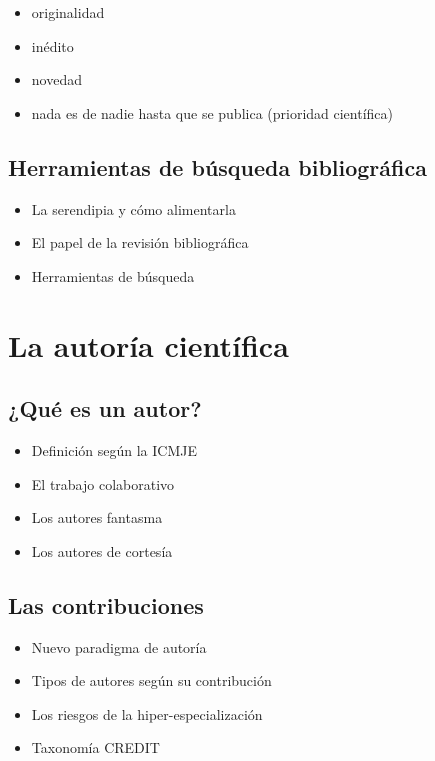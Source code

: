 \documentclass[
]{book}
\providecommand{\tightlist}{%
  \setlength{\itemsep}{0pt}\setlength{\parskip}{0pt}}
\begin{document}
\begin{itemize}
\tightlist
\item
  originalidad
\item
  inédito
\item
  novedad
\item
  nada es de nadie hasta que se publica (prioridad científica)
\end{itemize}

\hypertarget{herramientas-de-buxfasqueda-bibliogruxe1fica}{%
\section{Herramientas de búsqueda bibliográfica}\label{herramientas-de-buxfasqueda-bibliogruxe1fica}}

\begin{itemize}
\tightlist
\item
  La serendipia y cómo alimentarla
\item
  El papel de la revisión bibliográfica
\item
  Herramientas de búsqueda
\end{itemize}

\hypertarget{la-autoruxeda-cientuxedfica}{%
\chapter{La autoría científica}\label{la-autoruxeda-cientuxedfica}}

\hypertarget{quuxe9-es-un-autor}{%
\section{¿Qué es un autor?}\label{quuxe9-es-un-autor}}

\begin{itemize}
\tightlist
\item
  Definición según la ICMJE
\item
  El trabajo colaborativo
\item
  Los autores fantasma
\item
  Los autores de cortesía
\end{itemize}

\hypertarget{las-contribuciones}{%
\section{Las contribuciones}\label{las-contribuciones}}

\begin{itemize}
\tightlist
\item
  Nuevo paradigma de autoría
\item
  Tipos de autores según su contribución
\item
  Los riesgos de la hiper-especialización
\item
  Taxonomía CREDIT
\end{itemize}
\end{document}
